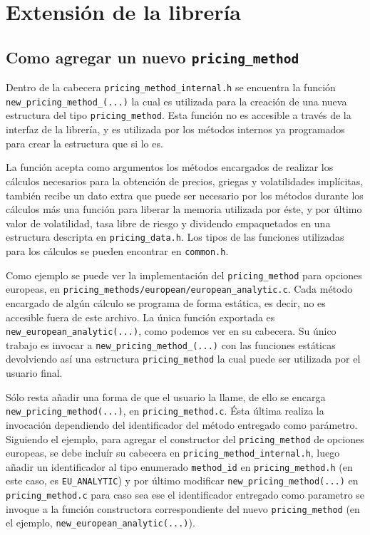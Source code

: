 \documentclass[12pt,a4paper,final]{article}
\begin{document}
\section{Extensión de la librería}
	\subsection{Como agregar un nuevo \texttt{pricing\_method}}
		Dentro de la cabecera \texttt{pricing\_method\_internal.h} se encuentra
		la función \texttt{new\_pricing\_method\_(...)} la cual es utilizada
		para la creación de una nueva estructura del tipo \texttt{pricing\_method}.
		Esta función no es accesible a través de la interfaz de la librería, y es utilizada
		por los métodos internos ya programados para crear la estructura que si lo es.

		La función acepta como argumentos los métodos encargados de realizar los cálculos
		necesarios para la obtención de precios, griegas y volatilidades implícitas, también recibe un dato
		extra que puede ser necesario por los métodos durante los cálculos más una función para liberar
		la memoria utilizada por éste, y por último valor de volatilidad, tasa libre de riesgo y dividendo
		empaquetados en una estructura descripta en \texttt{pricing\_data.h}. Los tipos de las funciones
		utilizadas para los cálculos se pueden encontrar en \texttt{common.h}.

		Como ejemplo se puede ver la implementación del \texttt{pricing\_method} para opciones europeas,
		en \texttt{pricing\_methods/european/european\_analytic.c}. Cada método encargado de algún cálculo
		se programa de forma estática, es decir, no es accesible fuera de este archivo. La única
		función exportada es \texttt{new\_european\_analytic(...)}, como podemos ver en su cabecera.
		Su único trabajo es invocar a \texttt{new\_pricing\_method\_(...)} con las funciones estáticas
		devolviendo así una estructura \texttt{pricing\_method} la cual puede ser utilizada por el usuario final.

		Sólo resta añadir una forma de que el usuario la llame, de ello se encarga \texttt{new\_pricing\_method(...)},
		en \texttt{pricing\_method.c}. Ésta última realiza la invocación dependiendo del identificador del método
		entregado como parámetro. Siguiendo el ejemplo, para agregar el constructor del \texttt{pricing\_method} de
		opciones europeas, se debe incluír su cabecera en \texttt{pricing\_method\_internal.h}, luego
		añadir un identificador al tipo enumerado \texttt{method\_id} en \texttt{pricing\_method.h} (en este caso,
		es \texttt{EU\_ANALYTIC}) y por último modificar \texttt{new\_pricing\_method(...)}
		en \texttt{pricing\_method.c} para caso sea ese el identificador entregado como parametro se invoque a
		la función constructora correspondiente del nuevo \texttt{pricing\_method} (en el ejemplo,
		\texttt{new\_european\_analytic(...)}).
\end{document}
